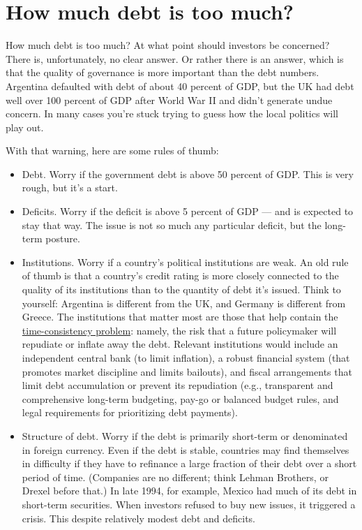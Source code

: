 \section{How much debt is too much?}

How much debt is too much?
At what point should investors be concerned?
There is, unfortunately, no clear answer.
Or rather there is an answer, which is that
the quality of governance is more important than the debt numbers.
Argentina defaulted with debt of about 40 percent of GDP,
but the UK had debt well over 100 percent of GDP after World War II
and didn't generate undue concern.
In many cases you're stuck trying to guess how the local politics will play out.

With that warning, here are some rules of thumb:
\begin{itemize}
\item Debt.  Worry if the government debt is above 50 percent of GDP.
This is very rough, but it's a start.

\item Deficits.  Worry if the deficit is above 5 percent of GDP ---
and is expected to stay that way.
The issue is not so much any particular deficit,
but the long-term posture.

\item Institutions.  
Worry if a country's political institutions are weak.
An old rule of thumb is that a country's credit rating is more closely
connected to the quality of its institutions
than to the quantity of debt it's issued.  
Think to yourself:  
Argentina is different from the UK, and Germany is different from Greece. 
The institutions
that matter most are those that help contain the \hyperref[sec:time_cons]{time-consistency problem}:
namely, the risk that a future policymaker will repudiate or
inflate away the debt. Relevant institutions would include an
independent central bank (to limit inflation), a robust financial system
(that promotes market discipline and limits bailouts), and fiscal arrangements
that limit debt accumulation or prevent its repudiation (e.g., transparent
and comprehensive long-term budgeting, pay-go or balanced budget
rules, and legal requirements for prioritizing debt payments).

\item Structure of debt.  
Worry if the debt is primarily short-term or denominated in
foreign currency.
Even if the debt is stable, countries
may find themselves in difficulty if they have to refinance
a large fraction of their debt over a short period of time.
(Companies are no different; think Lehman Brothers, or Drexel before that.)
In late 1994, for example, Mexico had much of its debt in short-term
securities.
When investors refused to buy new issues, it triggered a crisis.
This despite relatively modest debt and deficits.


\end{itemize}
